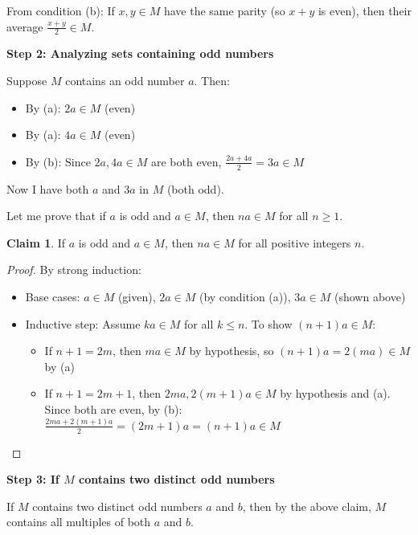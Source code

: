 \documentclass[12pt,a4paper]{article}
\theoremstyle{definition}
\newtheorem{claim}{Claim}
\begin{document}
        From condition (b): If $x, y \in M$ have the same parity (so $x + y$ is even), then their average $\frac{x + y}{2} \in M$.

        \textbf{Step 2: Analyzing sets containing odd numbers}

        Suppose $M$ contains an odd number $a$. Then:
        \begin{itemize}
            \item By (a): $2a \in M$ (even)
            \item By (a): $4a \in M$ (even)
            \item By (b): Since $2a, 4a \in M$ are both even, $\frac{2a + 4a}{2} = 3a \in M$
        \end{itemize}

        Now I have both $a$ and $3a$ in $M$ (both odd).

        Let me prove that if $a$ is odd and $a \in M$, then $na \in M$ for all $n \geq 1$.

        \begin{claim}
            If $a$ is odd and $a \in M$, then $na \in M$ for all positive integers $n$.
        \end{claim}

        \begin{proof}
            By strong induction:
            \begin{itemize}
                \item Base cases: $a \in M$ (given), $2a \in M$ (by condition (a)), $3a \in M$ (shown above)
                \item Inductive step: Assume $ka \in M$ for all $k \leq n$. To show $(n+1)a \in M$:
                \begin{itemize}
                    \item If $n+1 = 2m$, then $ma \in M$ by hypothesis, so $(n+1)a = 2(ma) \in M$ by (a)
                    \item If $n+1 = 2m+1$, then $2ma, 2(m+1)a \in M$ by hypothesis and (a). Since both are even, by (b): $\frac{2ma + 2(m+1)a}{2} = (2m+1)a = (n+1)a \in M$
                \end{itemize}
            \end{itemize}
        \end{proof}

        \textbf{Step 3: If $M$ contains two distinct odd numbers}

        If $M$ contains two distinct odd numbers $a$ and $b$, then by the above claim, $M$ contains all multiples of both $a$ and $b$.
\end{document}
